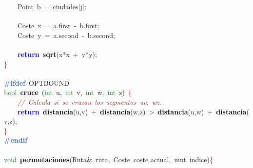 \mbox{}\ \ \ \ \textcolor{TealBlue}{Point}\ b\ \textcolor{BrickRed}{=}\ ciudades\textcolor{BrickRed}{[}j\textcolor{BrickRed}{];} \\
\mbox{}\ \ \ \  \\
\mbox{}\ \ \ \ \textcolor{TealBlue}{Coste}\ x\ \textcolor{BrickRed}{=}\ a\textcolor{BrickRed}{.}first\ \textcolor{BrickRed}{-}\ b\textcolor{BrickRed}{.}first\textcolor{BrickRed}{;} \\
\mbox{}\ \ \ \ \textcolor{TealBlue}{Coste}\ y\ \textcolor{BrickRed}{=}\ a\textcolor{BrickRed}{.}second\ \textcolor{BrickRed}{-}\ b\textcolor{BrickRed}{.}second\textcolor{BrickRed}{;} \\
\mbox{}\ \ \ \  \\
\mbox{}\ \ \ \ \textbf{\textcolor{Blue}{return}}\ \textbf{\textcolor{Black}{sqrt}}\textcolor{BrickRed}{(}x\textcolor{BrickRed}{*}x\ \textcolor{BrickRed}{+}\ y\textcolor{BrickRed}{*}y\textcolor{BrickRed}{);} \\
\mbox{}\textcolor{Red}{\}} \\
\mbox{} \\
\mbox{}\textbf{\textcolor{RoyalBlue}{\#ifdef}}\ OPTBOUND \\
\mbox{}\textcolor{ForestGreen}{bool}\ \textbf{\textcolor{Black}{cruce}}\ \textcolor{BrickRed}{(}\textcolor{ForestGreen}{int}\ u\textcolor{BrickRed}{,}\ \textcolor{ForestGreen}{int}\ v\textcolor{BrickRed}{,}\ \textcolor{ForestGreen}{int}\ w\textcolor{BrickRed}{,}\ \textcolor{ForestGreen}{int}\ z\textcolor{BrickRed}{)}\ \textcolor{Red}{\{} \\
\mbox{}\ \ \ \ \textit{\textcolor{Brown}{//\ Calcula\ si\ se\ cruzan\ los\ segmentos\ uv,\ wz.}} \\
\mbox{}\ \ \ \ \textbf{\textcolor{Blue}{return}}\ \textbf{\textcolor{Black}{distancia}}\textcolor{BrickRed}{(}u\textcolor{BrickRed}{,}v\textcolor{BrickRed}{)}\ \textcolor{BrickRed}{+}\ \textbf{\textcolor{Black}{distancia}}\textcolor{BrickRed}{(}w\textcolor{BrickRed}{,}z\textcolor{BrickRed}{)}\ \textcolor{BrickRed}{\textgreater{}}\ \textbf{\textcolor{Black}{distancia}}\textcolor{BrickRed}{(}u\textcolor{BrickRed}{,}w\textcolor{BrickRed}{)}\ \textcolor{BrickRed}{+}\ \textbf{\textcolor{Black}{distancia}}\textcolor{BrickRed}{(}v\textcolor{BrickRed}{,}z\textcolor{BrickRed}{);} \\
\mbox{}\textcolor{Red}{\}} \\
\mbox{}\textbf{\textcolor{RoyalBlue}{\#endif}} \\
\mbox{} \\
\mbox{}\textcolor{ForestGreen}{void}\ \textbf{\textcolor{Black}{permutaciones}}\textcolor{BrickRed}{(}Ruta\textcolor{BrickRed}{\&}\ ruta\textcolor{BrickRed}{,}\ \textcolor{TealBlue}{Coste}\ coste$\_$actual\textcolor{BrickRed}{,}\ \textcolor{TealBlue}{uint}\ indice\textcolor{BrickRed}{)}\textcolor{Red}{\{} \\
